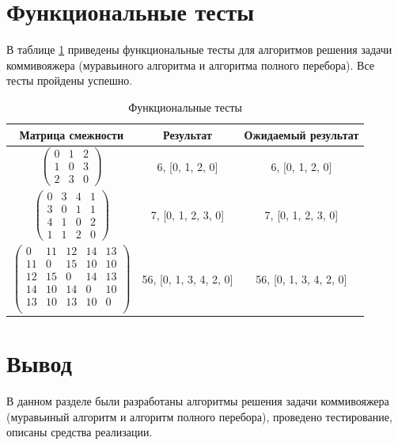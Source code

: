 \documentclass[a4paper,14pt, unknownkeysallowed]{extreport}
\begin{document}
\clearpage

\section{Функциональные тесты}

В таблице \ref{tbl:functional_test} приведены функциональные тесты для алгоритмов решения задачи коммивояжера (муравьиного алгоритма и алгоритма полного перебора). Все тесты пройдены успешно.

\begin{center}
\captionsetup{justification=raggedright,singlelinecheck=off}
\begin{longtable}[c]{|c|c|c|}
\caption{Функциональные тесты\label{tbl:functional_test}}
	\\ \hline
	Матрица смежности & Результат & Ожидаемый результат 
	\\ \hline
	$\begin{pmatrix}
		0 & 1 & 2\\
		1 & 0 & 3\\
		2 & 3 & 0
	\end{pmatrix}$ & 6, [0, 1, 2, 0] & 6, [0, 1, 2, 0]
	\\ \hline
	$\begin{pmatrix}
		0 & 3 & 4 & 1\\
		3 & 0 & 1 & 1\\
		4 & 1 & 0 & 2\\
		1 & 1 & 2 & 0
	\end{pmatrix}$ & 7, [0, 1, 2, 3, 0] & 7, [0, 1, 2, 3, 0]
	\\ \hline
	$\begin{pmatrix}
		0 & 11 & 12 & 14 & 13\\
		11 & 0 & 15 & 10 & 10\\
		12 & 15 & 0 & 14 & 13\\
		14 & 10 & 14 & 0 & 10\\
		13 & 10 & 13 & 10 & 0\\
	\end{pmatrix}$ & 56, [0, 1, 3, 4, 2, 0] & 56, [0, 1, 3, 4, 2, 0]
	\\ \hline

\end{longtable}
\end{center}


\section{Вывод}

В данном разделе были разработаны алгоритмы решения задачи коммивояжера (муравьиный алгоритм и алгоритм полного перебора), проведено тестирование, описаны средства реализации.
\end{document}
